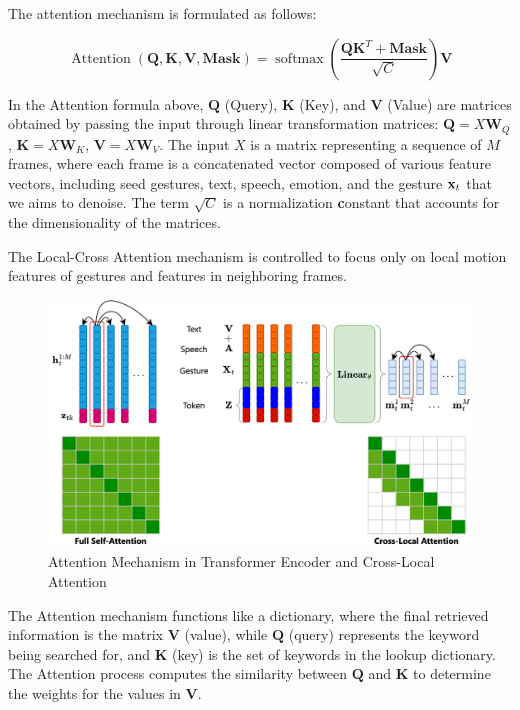 The attention mechanism is formulated as follows:

\begin{equation} \label{eq:attention}
	\operatorname{Attention}(\mathbf{Q}, \mathbf{K}, \mathbf{V}, \mathbf{Mask})=\operatorname{softmax}\left(\frac{\mathbf{Q} \mathbf{K}^{T}+\mathbf{Mask}}{\sqrt{C}}\right) \mathbf{V}
\end{equation}

In the Attention formula above, $\mathbf{Q}$ (Query), $\mathbf{K}$ (Key), and $\mathbf{V}$ (Value) are matrices obtained by passing the input through linear transformation matrices: $\mathbf{Q} = {X} \mathbf{W}_Q$, $\mathbf{K} = {X} \mathbf{W}_K$, $\mathbf{V} = {X} \mathbf{W}_V$. The input $X$ is a matrix representing a sequence of $M$ frames, where each frame is a concatenated vector composed of various feature vectors, including seed gestures, text, speech, emotion, and the gesture $\mathbf{x}_t$ that we aims to denoise. The term $\sqrt{C}$ is a normalization \textbf{c}onstant that accounts for the dimensionality of the matrices. 

The Local-Cross Attention mechanism is controlled to focus only on local motion features of gestures and features in neighboring frames.

\begin{figure}[h]
	\centering
	\includegraphics[width=0.7\linewidth]{figures/CrossLocalAttention}
	\caption{Attention Mechanism in Transformer Encoder and Cross-Local Attention}
	\label{fig:CrossLocalAttention}
\end{figure}

The Attention mechanism functions like a dictionary, where the final retrieved information is the matrix $\mathbf{V}$ (value), while $\mathbf{Q}$ (query) represents the keyword being searched for, and $\mathbf{K}$ (key) is the set of keywords in the lookup dictionary. The Attention process computes the similarity between \( \mathbf{Q} \) and \( \mathbf{K} \) to determine the weights for the values in \( \mathbf{V} \).

